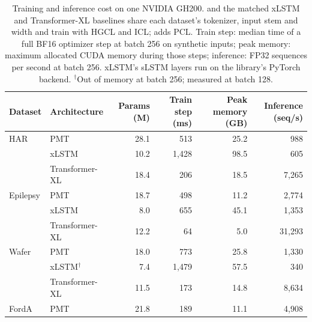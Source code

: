 \providecommand{\sd}[1]{\textsubscript{$\pm$#1}}
\providecommand{\revtab}[1]{#1}
\providecommand{\rev}[1]{#1}
\begin{table}[tb]
  \centering
  \footnotesize
  \caption{\revtab{\rev{Training and inference cost on one NVIDIA GH200. \METHODNAME and the matched xLSTM and Transformer-XL baselines share each dataset's tokenizer, input stem and width and train with HGCL and ICL; \METHODNAME adds PCL. Train step: median time of a full BF16 optimizer step at batch 256 on synthetic inputs; peak memory: maximum allocated CUDA memory during those steps; inference: FP32 sequences per second at batch 256. xLSTM's sLSTM layers run on the library's PyTorch backend. $^{\dagger}$Out of memory at batch 256; measured at batch 128.}}}
  \label{tab:arch-cost}
\begin{tabular}{llrrrr}
\toprule
Dataset & Architecture & Params (M) & Train step (ms) & Peak memory (GB) & Inference (seq/s) \\
\midrule
HAR & PMT & 28.1 & 513 & 25.2 & 988 \\
 & xLSTM & 10.2 & 1{,}428 & 98.5 & 605 \\
 & Transformer-XL & 18.4 & 206 & 18.5 & 7{,}265 \\
\addlinespace
Epilepsy & PMT & 18.7 & 498 & 11.2 & 2{,}774 \\
 & xLSTM & 8.0 & 655 & 45.1 & 1{,}353 \\
 & Transformer-XL & 12.2 & 64 & 5.0 & 31{,}293 \\
\addlinespace
Wafer & PMT & 18.0 & 773 & 25.8 & 1{,}330 \\
 & xLSTM$^{\dagger}$ & 7.4 & 1{,}479 & 57.5 & 340 \\
 & Transformer-XL & 11.5 & 173 & 14.8 & 8{,}634 \\
\addlinespace
FordA & PMT & 21.8 & 189 & 11.1 & 4{,}908 \\

\end{tabular}
\end{table}

